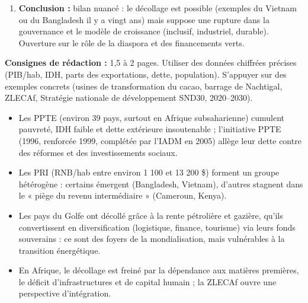 \documentclass[11pt]{article}
\newcommand{\cle}[1]{{\popxbold\color{popdark}#1}}
\begin{document}
\begin{exercice}
\begin{enumerate}
\begin{itemize}
\item Amélioration du climat des affaires, lutte contre la corruption, mobilisation des recettes fiscales (pression fiscale inférieure à 15\% du PIB).
\item Intégration régionale effective (CEMAC, ZLECAf) : marché élargi, chaînes de valeur régionales.
\item Capital humain : enseignement technique et professionnel, santé, protection sociale.
\end{itemize}
\item \textbf{Conclusion :} bilan nuancé : le décollage est possible (exemples du Vietnam ou du Bangladesh il y a vingt ans) mais suppose une rupture dans la gouvernance et le modèle de croissance (inclusif, industriel, durable). Ouverture sur le rôle de la diaspora et des financements verts.
\end{enumerate}
\textbf{Consignes de rédaction :} 1,5 à 2 pages. Utiliser des données chiffrées précises (PIB/hab, IDH, parts des exportations, dette, population). S'appuyer sur des exemples concrets (usines de transformation du cacao, barrage de Nachtigal, ZLECAf, Stratégie nationale de développement SND30, 2020--2030).
\end{exercice}

\begin{aretenir}
\begin{itemize}
\item Les \cle{PPTE} (environ 39 pays, surtout en Afrique subsaharienne) cumulent pauvreté, IDH faible et dette extérieure insoutenable ; l'initiative PPTE (1996, renforcée 1999, complétée par l'IADM en 2005) allège leur dette contre des réformes et des investissements sociaux.
\item Les \cle{PRI} (RNB/hab entre environ 1 100 et 13 200 \$) forment un groupe hétérogène : certains émergent (Bangladesh, Vietnam), d'autres stagnent dans le « piège du revenu intermédiaire » (Cameroun, Kenya).
\item Les \cle{pays du Golfe} ont décollé grâce à la rente pétrolière et gazière, qu'ils convertissent en diversification (logistique, finance, tourisme) via leurs fonds souverains : ce sont des foyers de la mondialisation, mais vulnérables à la transition énergétique.
\item En Afrique, le décollage est freiné par la dépendance aux matières premières, le déficit d'infrastructures et de capital humain ; la ZLECAf ouvre une perspective d'intégration.
\end{itemize}
\end{aretenir}
\end{document}

